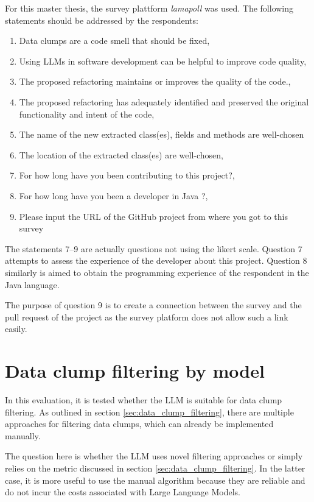 For this master thesis, the survey plattform \textit{lamapoll} \cite{lamapoll} was used.  The following statements should be addressed by the respondents:
\begin{enumerate}
\item Data clumps are a code smell that should be fixed, 
\item Using LLMs in software development can be helpful to improve code quality,
\item The proposed refactoring maintains or improves the quality of the code.,
\item The proposed refactoring has  adequately identified and preserved the original functionality and intent of the code, 
\item The name of the new extracted class(es), fields and methods are well-chosen
 \item The location of the extracted class(es) are well-chosen,
 \item For how long have you been contributing to this project?,
\item For how long have you been a developer in Java ?, 
\item Please input the URL of the GitHub project from where you got to this survey

\end{enumerate}


The statements 7--9 are actually questions not using the likert scale. Question 7 attempts to assess the experience of the developer about this project. Question 8 similarly is aimed to obtain the programming experience of the respondent in the Java language.

The purpose of question 9 is to create a connection between the survey and the pull request of the project as the survey platform does not allow such a link easily. 


\section{Data clump filtering by model}

In this evaluation, it is tested whether the  \ac{LLM} is suitable for data clump filtering. As outlined in section \ref{sec:data_clump_filtering}, there are multiple approaches for filtering data clumps, which can already be implemented manually. 

The question here is whether the \ac{LLM} uses novel filtering approaches or simply relies on the metric discussed in section \ref{sec:data_clump_filtering}. In the latter case, it is more useful to use the manual algorithm because they are reliable and do not incur the costs associated with Large Language Models. 

